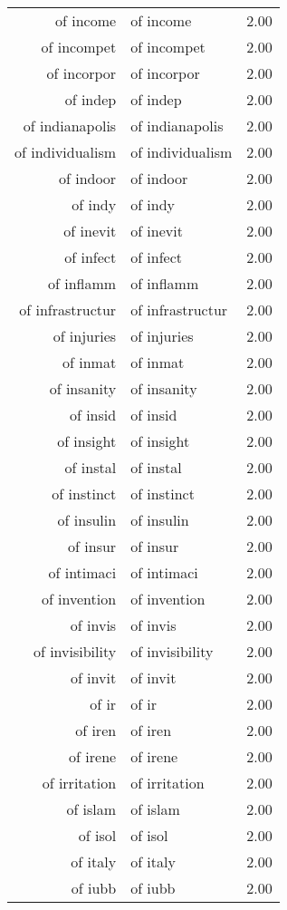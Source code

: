\begin{table}[ht]
\begin{tabular}{rlr}
  of income & of income & 2.00 \\ 
  of incompet & of incompet & 2.00 \\ 
  of incorpor & of incorpor & 2.00 \\ 
  of indep & of indep & 2.00 \\ 
  of indianapolis & of indianapolis & 2.00 \\ 
  of individualism & of individualism & 2.00 \\ 
  of indoor & of indoor & 2.00 \\ 
  of indy & of indy & 2.00 \\ 
  of inevit & of inevit & 2.00 \\ 
  of infect & of infect & 2.00 \\ 
  of inflamm & of inflamm & 2.00 \\ 
  of infrastructur & of infrastructur & 2.00 \\ 
  of injuries & of injuries & 2.00 \\ 
  of inmat & of inmat & 2.00 \\ 
  of insanity & of insanity & 2.00 \\ 
  of insid & of insid & 2.00 \\ 
  of insight & of insight & 2.00 \\ 
  of instal & of instal & 2.00 \\ 
  of instinct & of instinct & 2.00 \\ 
  of insulin & of insulin & 2.00 \\ 
  of insur & of insur & 2.00 \\ 
  of intimaci & of intimaci & 2.00 \\ 
  of invention & of invention & 2.00 \\ 
  of invis & of invis & 2.00 \\ 
  of invisibility & of invisibility & 2.00 \\ 
  of invit & of invit & 2.00 \\ 
  of ir & of ir & 2.00 \\ 
  of iren & of iren & 2.00 \\ 
  of irene & of irene & 2.00 \\ 
  of irritation & of irritation & 2.00 \\ 
  of islam & of islam & 2.00 \\ 
  of isol & of isol & 2.00 \\ 
  of italy & of italy & 2.00 \\ 
  of iubb & of iubb & 2.00 \\ 

\end{tabular}
\end{table}
